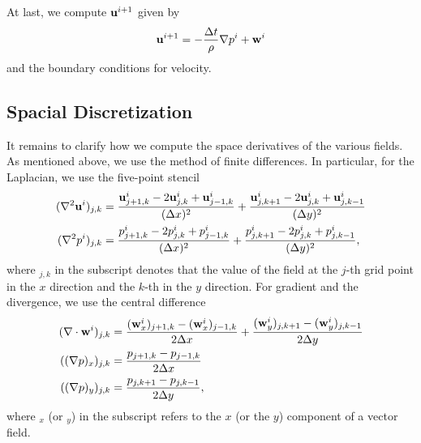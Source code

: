 \documentclass[11pt,a4paper,twoside,openright]{report}
\begin{document}
At last, we compute $\mathbf u^{i+1}$ given by
\begin{align*}
	\mathbf u^{i+1}=-\frac{\Delta t}\rho\nabla p^i+\mathbf w^i
\end{align*}
and the boundary conditions for velocity.

\subsection{Spacial Discretization}
It remains to clarify how we compute the space derivatives of the various fields. As mentioned above, we use the method of finite differences. In particular, for the Laplacian, we use the five-point stencil
\begin{align*}
	(\nabla^2\mathbf u^i)_{j,k}&=\frac{\mathbf u^i_{j+1,k}-2\mathbf u^i_{j,k}+\mathbf u^i_{j-1,k}}{(\Delta x)^2}+\frac{\mathbf u^i_{j,k+1}-2\mathbf u^i_{j,k}+\mathbf u^i_{j,k-1}}{(\Delta y)^2}\\
	(\nabla^2p^i)_{j,k}&=\frac{p^i_{j+1,k}-2p^i_{j,k}+p^i_{j-1,k}}{(\Delta x)^2}+\frac{p^i_{j,k+1}-2p^i_{j,k}+p^i_{j,k-1}}{(\Delta y)^2},
\end{align*}
where ${}_{j,k}$ in the subscript denotes that the value of the field at the $j$-th grid point in the $x$ direction and the $k$-th in the $y$ direction. For gradient and the divergence, we use the central difference
\begin{align*}
	(\nabla\cdot\mathbf w^i)_{j,k}&=\frac{(\mathbf w^i_x)_{j+1,k}-(\mathbf w^i_x)_{j-1,k}}{2\Delta x}+\frac{(\mathbf w^i_y)_{j,k+1}-(\mathbf w^i_y)_{j,k-1}}{2\Delta y}\\
	((\nabla p)_x)_{j,k}&=\frac{p_{j+1,k}-p_{j-1,k}}{2\Delta x}\\
	((\nabla p)_y)_{j,k}&=\frac{p_{j,k+1}-p_{j,k-1}}{2\Delta y},
\end{align*}
where ${}_x$ (or ${}_y$) in the subscript refers to the $x$ (or the $y$) component of a vector field.
\end{document}
